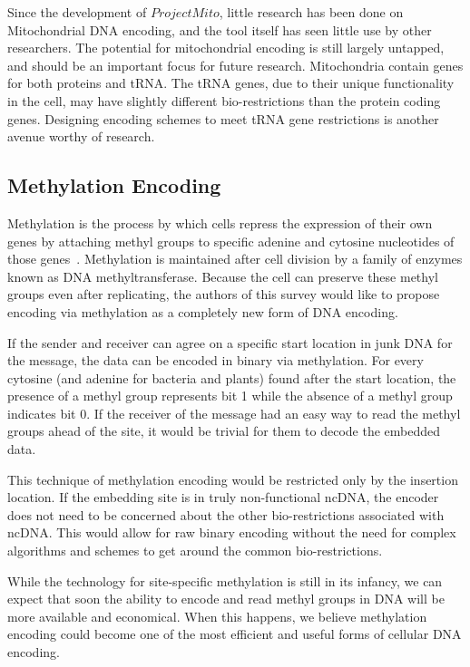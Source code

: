 \documentclass{bioinfo}
\begin{document}
Since the development of $Project Mito$, little research has been done on Mitochondrial DNA encoding, and the tool itself has seen little use by other researchers. The potential for mitochondrial encoding is still largely untapped, and should be an important focus for future research. Mitochondria contain genes for both proteins and tRNA. The tRNA genes, due to their unique functionality in the cell, may have slightly different bio-restrictions than the protein coding genes. Designing encoding schemes to meet tRNA gene restrictions is another avenue worthy of research.

\subsection{Methylation Encoding}

Methylation is the process by which cells repress the expression of their own genes by attaching methyl groups to specific adenine and cytosine nucleotides of those genes~\cite{RRBW2006B}. Methylation is maintained after cell division by a family of enzymes known as DNA methyltransferase. Because the cell can preserve these methyl groups even after replicating, the authors of this survey would like to propose encoding via methylation as a completely new form of DNA encoding.

If the sender and receiver can agree on a specific start location in junk DNA for the message, the data can be encoded in binary via methylation. For every cytosine (and adenine for bacteria and plants) found after the start location, the presence of a methyl group represents bit 1 while the absence of a methyl group indicates bit 0. If the receiver of the message had an easy way to read the methyl groups ahead of the site, it would be trivial for them to decode the embedded data.

This technique of methylation encoding would be restricted only by the insertion location. If the embedding site is in truly non-functional ncDNA, the encoder does not need to be concerned about the other bio-restrictions associated with ncDNA. This would allow for raw binary encoding without the need for complex algorithms and schemes to get around the common bio-restrictions.

While the technology for site-specific methylation is still in its infancy, we can expect that soon the ability to encode and read methyl groups in DNA will be more available and economical. When this happens, we believe methylation encoding could become one of the most efficient and useful forms of cellular DNA encoding.










\end{document}
